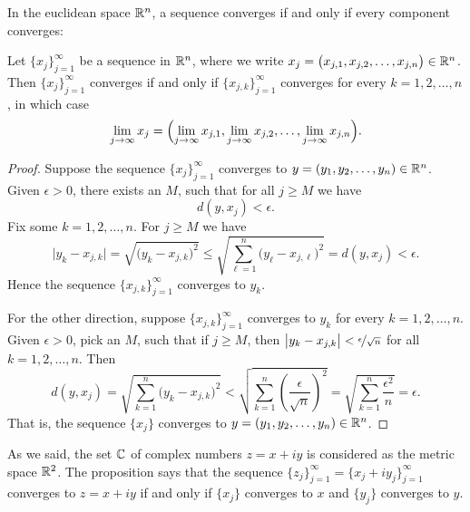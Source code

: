 In the euclidean space ${\mathbb{R}}^n$, a sequence converges if and only if every
component converges:

\begin{prop} \label{prop:msconveuc}
Let $\{ x_j \}_{j=1}^\infty$ be a sequence in ${\mathbb{R}}^n$,
where we write $x_j = \bigl(x_{j,1},x_{j,2},\ldots,x_{j,n}\bigr) \in {\mathbb{R}}^n$.
Then $\{ x_j \}_{j=1}^\infty$ converges if and only if
$\{ x_{j,k} \}_{j=1}^\infty$ converges for every $k=1,2,\ldots,n$, in which case
\begin{equation*}
\lim_{j\to\infty}
x_j =
\Bigl(
\lim_{j\to\infty} x_{j,1},
\lim_{j\to\infty} x_{j,2},
\ldots,
\lim_{j\to\infty} x_{j,n}
\Bigr) .
\end{equation*}
\end{prop}

\begin{proof}
Suppose
the sequence
$\{ x_j \}_{j=1}^\infty$ converges to
$y = (y_1,y_2,\ldots,y_n) \in {\mathbb{R}}^n$.
Given $\epsilon > 0$, there exists an $M$, such that for all
$j \geq M$ we have
\begin{equation*}
d(y,x_j) < \epsilon.
\end{equation*}
Fix some $k=1,2,\ldots,n$.  For $j \geq M$ we have
\begin{equation*}
\bigl\lvert y_k - x_{j,k} \bigr\rvert
=
\sqrt{{\bigl(y_k - x_{j,k} \bigr)}^2}
\leq
\sqrt{\sum_{\ell=1}^n {\bigl(y_\ell-x_{j,\ell}\bigr)}^2}
= d(y,x_j) < \epsilon .
\end{equation*}
Hence the sequence $\{ x_{j,k} \}_{j=1}^\infty$ converges to $y_k$.

For the other direction, suppose 
$\{ x_{j,k} \}_{j=1}^\infty$ converges to $y_k$ for every $k=1,2,\ldots,n$.
Given $\epsilon > 0$, pick an $M$, such that if $j \geq M$, then 
$\bigl\lvert y_k-x_{j,k} \bigr\rvert < \nicefrac{\epsilon}{\sqrt{n}}$ for all
$k=1,2,\ldots,n$.  Then
\begin{equation*}
d(y,x_j)
=
\sqrt{\sum_{k=1}^n {\bigl(y_k-x_{j,k}\bigr)}^2}
<
\sqrt{\sum_{k=1}^n {\left(\frac{\epsilon}{\sqrt{n}}\right)}^2}
=
\sqrt{\sum_{k=1}^n \frac{{\epsilon^2}}{n}}
= \epsilon .
\end{equation*}
That is, the sequence $\{ x_j \}$ converges to
$y = (y_1,y_2,\ldots,y_n) \in {\mathbb{R}}^n$.
\end{proof}

\begin{example}
As we said, the set ${\mathbb{C}}$ of complex numbers $z = x+iy$ is considered 
as the metric space ${\mathbb{R}}^2$.  The proposition says that the
sequence $\{ z_j \}_{j=1}^\infty = \{ x_j + iy_j \}_{j=1}^\infty$ converges
to $z = x+iy$
if and only if $\{ x_j \}$ converges to $x$ and 
$\{ y_j \}$ converges to $y$.
\end{example}

